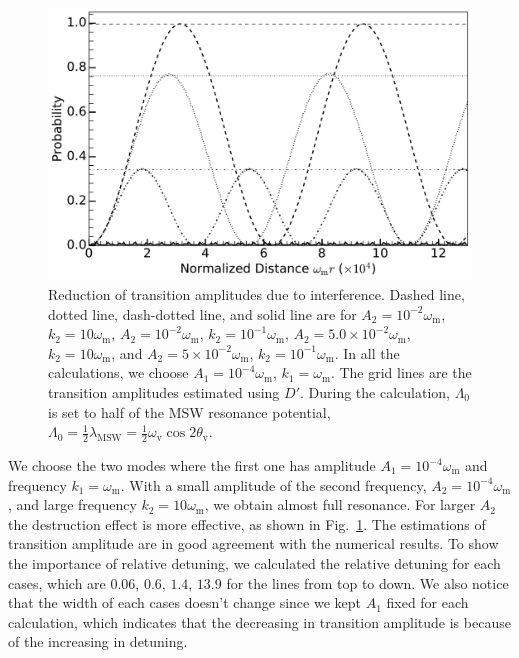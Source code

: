 \documentclass[%
reprint,
 amsmath,amssymb,
 prd,
]{revtex4-1}
\newcommand{\RD}{D}
\begin{document}
\begin{figure}
                \centering
                \includegraphics[width=\columnwidth]{assets/interference-reduction}
                \caption{Reduction of transition amplitudes due to interference. Dashed line, dotted line, dash-dotted line, and solid line are for $A_2=10^{-2}\omega_{\mathrm{m}}$, $k_2=10\omega_{\mathrm m}$, $A_2=10^{-2}\omega_{\mathrm{m}}$, $k_2=10^{-1}\omega_{\mathrm m}$, $A_2=5.0\times 10^{-2}\omega_{\mathrm{m}}$, $k_2=10\omega_{\mathrm m}$, and $A_2=5\times 10^{-2}\omega_{\mathrm{m}}$, $k_2=10^{-1}\omega_{\mathrm m}$. In all the calculations, we choose $A_1=10^{-4}\omega_{\mathrm m}$, $k_1=\omega_{\mathrm m}$. The grid lines are the transition amplitudes estimated using $\RD'$. During the calculation, $\Lambda_0$ is set to half of the MSW resonance potential, $\Lambda_0 = \frac{1}{2}\lambda_{\mathrm{MSW}}=\frac{1}{2}\omega_{\mathrm{v}}\cos 2\theta_{\mathrm v}$.}
                \label{fig-rabi-oscillations-energy-gap-change}
\end{figure}


We choose the two modes where the first one has amplitude $A_1 = 10^{-4}\omega_{\mathrm{m}}$ and frequency $k_1 = \omega_{\mathrm{m}}$. With a small amplitude of the second frequency, $A_2=10^{-4}\omega_{\mathrm{m}}$, and large frequency $k_2=10\omega_{\mathrm{m}}$, we obtain almost full resonance. For larger $A_2$ the destruction effect is more effective, as shown in Fig.~\ref{fig-rabi-oscillations-energy-gap-change}. The estimations of transition amplitude are in good agreement with the numerical results. To show the importance of relative detuning, we calculated the relative detuning for each cases, which are $0.06$, $0.6$, $1.4$, $13.9$ for the lines from top to down. We also notice that the width of each cases doesn't change since we kept $A_1$ fixed for each calculation, which indicates that the decreasing in transition amplitude is because of the increasing in detuning.
\end{document}
